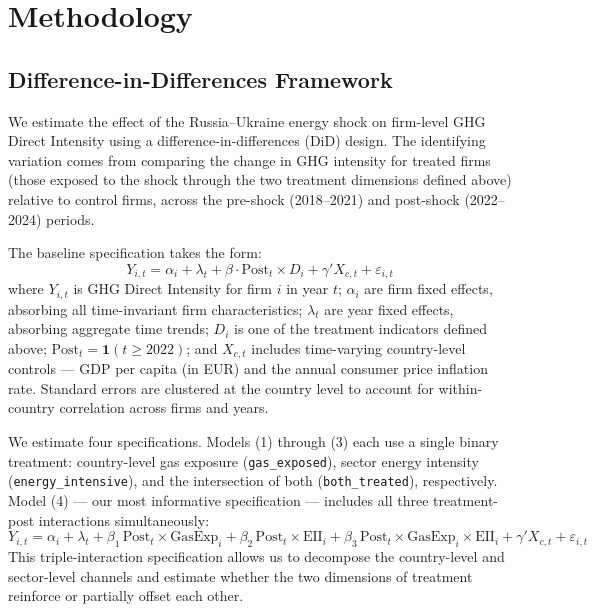 \documentclass[12pt,a4paper]{article}
\begin{document}
\section{Methodology}
\label{sec:method}


\subsection{Difference-in-Differences Framework}

We estimate the effect of the Russia–Ukraine energy shock on firm-level GHG Direct Intensity using a difference-in-differences (DiD) design. The identifying variation comes from comparing the change in GHG intensity for treated firms (those exposed to the shock through the two treatment dimensions defined above) relative to control firms, across the pre-shock (2018--2021) and post-shock (2022--2024) periods.

The baseline specification takes the form:
\begin{equation}
Y_{i,t} = \alpha_i + \lambda_t + \beta \cdot \text{Post}_t \times D_i + \gamma' X_{c,t} + \varepsilon_{i,t}
\label{eq:did}
\end{equation}
where $Y_{i,t}$ is GHG Direct Intensity for firm $i$ in year $t$; $\alpha_i$ are firm fixed effects, absorbing all time-invariant firm characteristics; $\lambda_t$ are year fixed effects, absorbing aggregate time trends; $D_i$ is one of the treatment indicators defined above; $\text{Post}_t = \mathbf{1}(t \geq 2022)$; and $X_{c,t}$ includes time-varying country-level controls — GDP per capita (in EUR) and the annual consumer price inflation rate. Standard errors are clustered at the country level to account for within-country correlation across firms and years.

We estimate four specifications. Models (1) through (3) each use a single binary treatment: country-level gas exposure (\texttt{gas\_exposed}), sector energy intensity (\texttt{energy\_intensive}), and the intersection of both (\texttt{both\_treated}), respectively. Model (4) — our most informative specification — includes all three treatment-post interactions simultaneously:
\begin{equation}
Y_{i,t} = \alpha_i + \lambda_t
  + \beta_1 \, \text{Post}_t \times \text{GasExp}_i
  + \beta_2 \, \text{Post}_t \times \text{EII}_i
  + \beta_3 \, \text{Post}_t \times \text{GasExp}_i \times \text{EII}_i
  + \gamma' X_{c,t} + \varepsilon_{i,t}
\label{eq:triple}
\end{equation}
This triple-interaction specification allows us to decompose the country-level and sector-level channels and estimate whether the two dimensions of treatment reinforce or partially offset each other.
\end{document}
